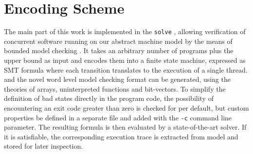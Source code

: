 \section{Encoding Scheme}

The main part of this work is implemented in the \texttt{solve} ,
allowing verification of concurrent software running on our abstract machine model by the means of bounded model checking \cite{ref:BMC}.
It takes an arbitrary number of programs plus the upper bound \CHANGE{$\BOUND$} as input and encodes them into a finite state machine, expressed as  SMT formula where each transition translates to the execution of a single thread.
{\SMTLIB} \cite{ref:SMT-Lib} and the novel {\BTOR} \cite{ref:BTOR2} word level model checking format can be generated, using the theories of arrays, uninterpreted functions and bit-vectors.
To simplify the definition of bad states directly in the program code, the possibility of encountering an exit code greater than zero is checked for per default, but custom properties  be defined in a separate file and added with the \texttt{-c} command line parameter.
The resulting formula is then evaluated by a state-of-the-art  solver.
If it is satisfiable, the corresponding execution trace is extracted from  model and stored for later inspection.


